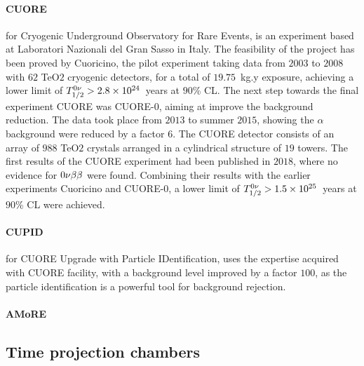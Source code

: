 \paragraph{CUORE} for Cryogenic Underground Observatory for Rare Events, is an experiment based at Laboratori Nazionali del Gran Sasso in Italy.
The feasibility of the project has been proved by Cuoricino, the pilot experiment taking data from $2003$ to $2008$ with $62$ TeO$2$ cryogenic detectors, for a total of $19.75$~kg.y exposure, achieving a lower limit of $T_{1/2}^{0\nu}>2.8\times 10^{24}$~years at $90$\% CL.
The next step towards the final experiment CUORE was CUORE-$0$, aiming at improve the background reduction.
The data took place from $2013$ to summer $2015$, showing the $\alpha$ background were reduced by a factor $6$.
The CUORE detector consists of an array of $988$ TeO$2$ crystals arranged in a cylindrical structure of $19$ towers.
The first results of the CUORE experiment had been published in $2018$, where no evidence for $0\nu\beta\beta$ were found.
Combining their results with the earlier experiments Cuoricino and CUORE-$0$, a lower limit of $T_{1/2}^{0\nu}>1.5\times 10^{25}$~years at $90$\% CL were achieved.



\paragraph{CUPID} for CUORE Upgrade with Particle IDentification, uses the expertise acquired with CUORE facility, with a background level improved by a factor $100$, as the particle identification is a powerful tool for background rejection.


\paragraph{AMoRE}
\subsection{Time projection chambers}
\label{subsec:TPC}

